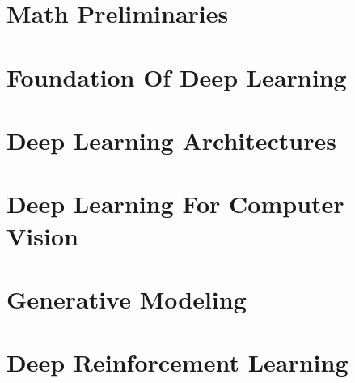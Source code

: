 \documentclass[10pt, a4paper, landscape]{extarticle}
\author{Fabio Bühler, fabuehle@ethz.ch}
\begin{document}
    \setlength{\columnseprule}{0.5pt} %
    \begin{multicols*}{4} %
    \begin{adjustwidth}{1mm}{1mm} %


            \section{Math Preliminaries}
                
            \section{Foundation Of Deep Learning}
                

            \section{Deep Learning Architectures}
                

            \section{Deep Learning For Computer Vision}
                

            \section{Generative Modeling}
                

            \section{Deep Reinforcement Learning}
                


    \end{adjustwidth}%
    \end{multicols*}
\end{document}
